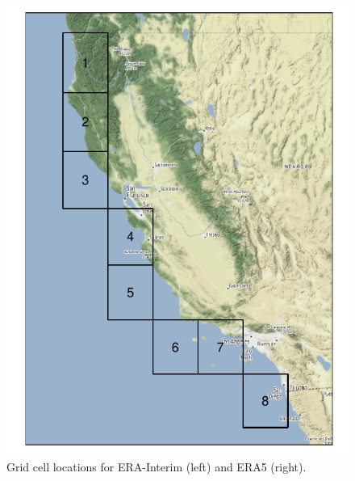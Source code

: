 \begin{figure}[tb]
    \caption{Grid cell locations for ERA-Interim (left) and ERA5 (right).\label{fig:gridlocs}}
    \centering
    \begin{minipage}{0.25\textwidth}
    \centering
    \includegraphics[width=0.99\linewidth]{./images/erai_grid}
    \end{minipage}%
    \begin{minipage}{0.25\textwidth}
    \centering

\end{minipage}
\end{figure}
